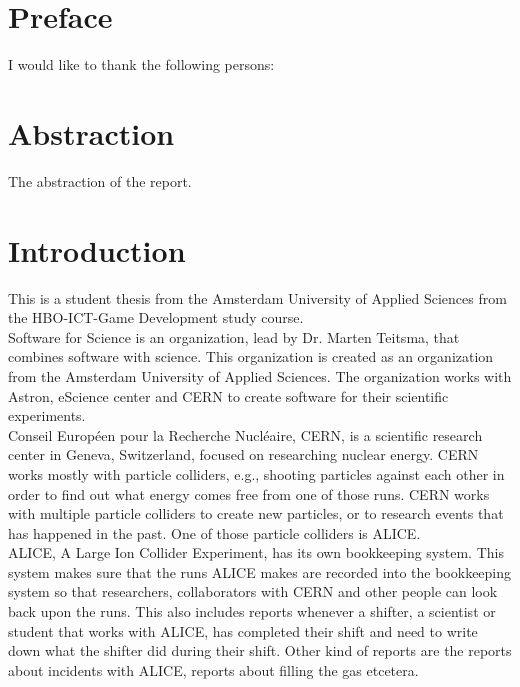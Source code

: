 \documentclass[paper=a4, fontsize=11pt,twoside]{scrartcl}	%
\begin{document}
\section*{Preface}
I would like to thank the following persons: \\

\newpage
\section*{Abstraction}
The abstraction of the report.
\newpage
\section{Introduction}
This is a student thesis from the Amsterdam University of Applied Sciences from the HBO-ICT-Game Development study course.  \\
Software for Science is an organization, lead by Dr. Marten Teitsma, that combines software with science. This organization is created as an organization from the Amsterdam University of Applied Sciences. The organization works with Astron, eScience center and CERN to create software for their scientific experiments. \\
Conseil Européen pour la Recherche Nucléaire, CERN, is a scientific research center in Geneva, Switzerland, focused on researching nuclear energy. CERN works mostly with particle colliders, e.g., shooting particles against each other in order to find out what energy comes free from one of those runs. CERN works with multiple particle colliders to create new particles, or to research events that has happened in the past. One of those particle colliders is ALICE. \\
ALICE, A Large Ion Collider Experiment, has its own bookkeeping system. This system makes sure that the runs ALICE makes are recorded into the bookkeeping system so that researchers, collaborators with CERN and other people can look back upon the runs. This also includes reports whenever a shifter, a scientist or student that works with ALICE, has completed their shift and need to write down what the shifter did during their shift. Other kind of reports are the reports about incidents with ALICE, reports about filling the gas etcetera. \\
\end{document}
